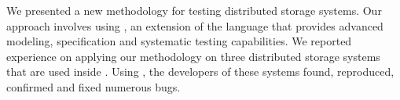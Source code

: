 We presented a new methodology for testing distributed storage systems. Our approach involves using \psharp, an extension of the \csharp language that provides advanced modeling, specification and systematic testing capabilities. We reported experience on applying our methodology on three distributed storage systems that are used inside \Microsoft. Using \psharp, the developers of these systems found, reproduced, confirmed and fixed numerous bugs.